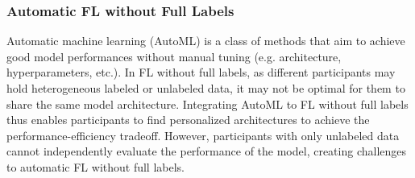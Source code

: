 \documentclass[11pt]{article}
\begin{document}
\subsubsection{Automatic FL without Full Labels}
Automatic machine learning (AutoML) \cite{he2021automl} is a class of methods that aim to achieve good model performances without manual tuning (e.g. architecture, hyperparameters, etc.). In FL without full labels, as different participants may hold heterogeneous labeled or unlabeled data, it may not be optimal for them to share the same model architecture. Integrating AutoML to FL without full labels thus enables participants to find personalized architectures to achieve the performance-efficiency tradeoff. However, participants with only unlabeled data cannot independently evaluate the performance of the model, creating challenges to automatic FL without full labels. 
\end{document}
